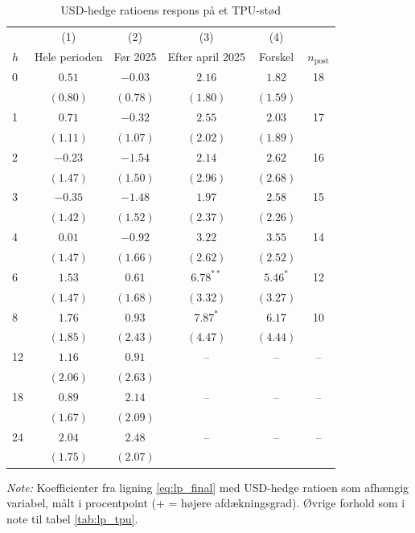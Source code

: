 \begin{table}[H]
\centering
\caption{USD-hedge ratioens respons på et TPU-stød}
\label{tab:lp_hr_tpu}
\begin{threeparttable}
\begin{tabular}{l cccc c}
\toprule
 & (1) & (2) & (3) & (4) & \\
$h$ & Hele perioden & Før 2025 & Efter april 2025 & Forskel & $n_{\text{post}}$ \\
\midrule
0 & $0.51$ & $-0.03$ & $2.16$ & $1.82$ & 18 \\
 & $(0.80)$ & $(0.78)$ & $(1.80)$ & $(1.59)$ & \\[2pt]
1 & $0.71$ & $-0.32$ & $2.55$ & $2.03$ & 17 \\
 & $(1.11)$ & $(1.07)$ & $(2.02)$ & $(1.89)$ & \\[2pt]
2 & $-0.23$ & $-1.54$ & $2.14$ & $2.62$ & 16 \\
 & $(1.47)$ & $(1.50)$ & $(2.96)$ & $(2.68)$ & \\[2pt]
3 & $-0.35$ & $-1.48$ & $1.97$ & $2.58$ & 15 \\
 & $(1.42)$ & $(1.52)$ & $(2.37)$ & $(2.26)$ & \\[2pt]
4 & $0.01$ & $-0.92$ & $3.22$ & $3.55$ & 14 \\
 & $(1.47)$ & $(1.66)$ & $(2.62)$ & $(2.52)$ & \\[2pt]
6 & $1.53$ & $0.61$ & $6.78^{**}$ & $5.46^{*}$ & 12 \\
 & $(1.47)$ & $(1.68)$ & $(3.32)$ & $(3.27)$ & \\[2pt]
8 & $1.76$ & $0.93$ & $7.87^{*}$ & $6.17$ & 10 \\
 & $(1.85)$ & $(2.43)$ & $(4.47)$ & $(4.44)$ & \\[2pt]
12 & $1.16$ & $0.91$ & – & – & – \\
 & $(2.06)$ & $(2.63)$ &  &  & \\[2pt]
18 & $0.89$ & $2.14$ & – & – & – \\
 & $(1.67)$ & $(2.09)$ &  &  & \\[2pt]
24 & $2.04$ & $2.48$ & – & – & – \\
 & $(1.75)$ & $(2.07)$ &  &  & \\[2pt]
\bottomrule
\end{tabular}
\begin{tablenotes}[flushleft]\footnotesize
\item \textit{Note:} Koefficienter fra ligning \eqref{eq:lp_final} med USD-hedge ratioen som afhængig variabel, målt i procentpoint (+ = højere afdækningsgrad). Øvrige forhold som i note til tabel \ref{tab:lp_tpu}.
\end{tablenotes}
\end{threeparttable}
\end{table}